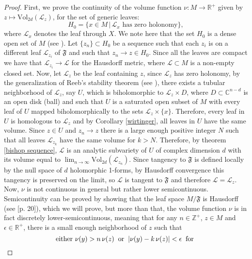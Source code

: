 \documentclass[12pt,twoside,a4paper]{report}
\newcommand{\zah}{\ensuremath{ \mathbb Z }}
\newcommand{\co}{\ensuremath{\mathbb C }}
\newcommand{\re}{\ensuremath{\mathbb R }}
\begin{document}
\begin{proof}
First, we prove the continuity of the volume function $\nu:M\rightarrow\re^{+}$ given by
$z\mapsto \textrm{Vol}_{2d}(\mathcal{L}_z)$, for the set of generic leaves:
$$
H_0=\lbrace x\in M\,\vert\,\mathcal{L}_x\text{ has zero holonomy}\rbrace,
$$
where $\mathcal{L}_x$ denotes the leaf through $X$. We note here that the set $H_0$ is a dense
open set of $M$ (see \cite{EMT}). Let $\lbrace z_n\rbrace\subset H_0$ be a
sequence such that each $z_i$ is on a different leaf $\mathcal{L}_{z_i}$ of
$\mathfrak{F}$ and such that $z_n\rightarrow z\in H_0$. Since all the leaves
are compact we have that $\mathcal{L}_{z_i}\rightarrow\mathcal{L}$ for the
Hausdorff metric, where $\mathcal{L}\subset M$ is a non-empty closed set.
Now, let $\mathcal{L}_z$ be the leaf containing $z$, since $\mathcal{L}_z$ has zero
holonomy, by the generalization of Reeb's stability theorem (see \cite{Thurston}), there exists a tubular neighborhood of
$\mathcal{L}_z$, say $U$, which is biholomorphic to $\mathcal{L}_z\times D$,
where $D\subset\co^{n-d}$ is an open disk (ball) and such that $U$ is a
saturated open subset of $M$ with every leaf of $U$ mapped biholomorphically to
the sets $\mathcal{L}_z\times\lbrace x \rbrace$. Therefore, every leaf in $U$ is
homologous to $\mathcal{L}_z$ and by Corollary \ref{wirtinger}, all leaves in
$U$ have the same volume. Since $z\in U$ and $z_n\rightarrow z$ there is a
large enough positive integer $N$ such that all leaves $\mathcal{L}_{z_k}$ have
the same volume for $k>N$. Therefore, by theorem \ref{bishop sequence},
$\mathcal{L}$ is an analytic subvariety of $U$ of complex dimension $d$ with
its volume equal to $\lim_{n\rightarrow\infty} \textrm{Vol}_{2d}(\mathcal{L}_{z_n})$. Since
tangency to $\mathfrak{F}$ is defined locally by the null space of $d$ holomorphic
1-forms, by Hausdorff convergence this tangency
is preserved on the limit, so $\mathcal{L}$ is tangent to $\mathfrak{F}$ and therefore $\mathcal{L}=\mathcal{L}_z$. Now, $\nu$
is not continuous in general but rather lower semicontinuous. Semicontinuity can
be proved by showing that the leaf space $M/\mathfrak{F}$ is Hausdorff (see \cite{EMS}[p. 20]),
which we will prove, but more than that, the volume
function $\nu$ is in fact discretely lower-semicontinuous, meaning that for any
$n\in\zah^+$, $z\in M$ and $\epsilon\in\re^+$, there is a small enough
neighborhood of $z$ such that
$$
\text{either }\nu(y)>n\,\nu(z)\hspace{0.2cm}\text{or}\hspace{0.2cm}\vert\nu(y)-k\,\nu(z)\vert<\epsilon\hspace{0.2cm}\text{for
}$$
\end{proof}
\end{document}

